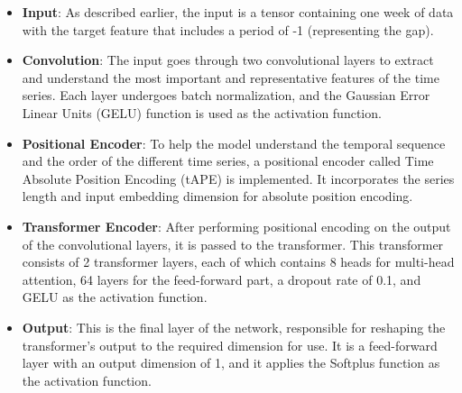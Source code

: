 %

\begin{itemize}
	\item \textbf{Input}: As described earlier,
	      the input is a tensor containing one week of data with the
	      target feature that includes a period of -1 (representing the gap).
	\item \textbf{Convolution}: The input goes through two convolutional layers to extract and understand the most important and representative features of the time series. Each layer undergoes batch normalization, and the Gaussian Error Linear Units (GELU)\cite{gelu} function is used as the activation function.
	\item \textbf{Positional Encoder}: To help the model understand the temporal sequence and the order of the different time series, a positional encoder called Time Absolute Position Encoding (tAPE)\cite{tape} is implemented. It incorporates the series length and input embedding dimension for absolute position encoding\cite{tape}.
	\item \textbf{Transformer Encoder}: After performing positional encoding on the output of the convolutional layers, it is passed to the transformer. This transformer\cite{attention} consists of 2 transformer layers, each of which contains 8 heads for multi-head attention\cite{attention}, 64 layers for the feed-forward part, a dropout rate of 0.1, and GELU as the activation function.
	\item \textbf{Output}: This is the final layer of the network, responsible for reshaping the transformer's output to the required dimension for use. It is a feed-forward layer with an output dimension of 1, and it applies the Softplus\cite{functions} function as the activation function.
\end{itemize}

